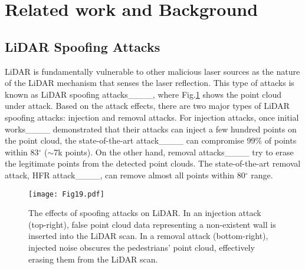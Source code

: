 \section{Related work and Background}
\subsection{LiDAR Spoofing Attacks} \label{sec:lidar_spoofing}
LiDAR is fundamentally vulnerable to other malicious laser sources as the nature of the LiDAR mechanism that senses the laser reflection. This type of attacks is known as LiDAR spoofing attacks____, where Fig.\ref{example_spoofing} shows the point cloud under attack. Based on the attack effects, there are two major types of LiDAR spoofing attacks: injection and removal attacks. For injection attacks, once initial works____ demonstrated that their attacks can inject a few hundred points on the point cloud, the state-of-the-art attack____ can compromise 99\% of points within 83$^\circ$ ($\sim$7k points). 
On the other hand, removal attacks____ try to erase the legitimate points from the detected point clouds. The state-of-the-art removal attack, HFR attack____, can remove almost all points within 80$^\circ$ range. 

\begin{figure}[tb]
  \centering
  \texttt{[image: Fig19.pdf]}
  \caption{The effects of spoofing attacks on LiDAR. In an injection attack (top-right), false point cloud data representing a non-existent wall is inserted into the LiDAR scan. In a removal attack (bottom-right), injected noise obscures the pedestrians' point cloud, effectively erasing them from the LiDAR scan.}
  \label{example_spoofing}
\end{figure}



